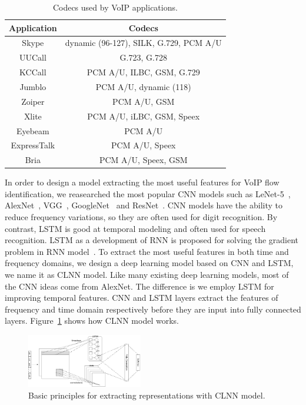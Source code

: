 \documentclass[conference]{IEEEtran}
\begin{document}
\begin{table}[htbp]
  \caption{Codecs used by VoIP applications.}
  \label{tab:codecs}
  \centering
  \begin{tabular}{c c}
    \hline
    \textbf{Application} & \textbf{Codecs}\\
    \hline
    Skype      & dynamic (96-127), SILK, G.729, PCM A/U  \\
    UUCall      & G.723, G.728  \\
    KCCall      & PCM A/U, ILBC, GSM, G.729  \\
    Jumblo      & PCM A/U, dynamic (118)  \\
    Zoiper      & PCM A/U, GSM  \\
    Xlite      &  PCM A/U, iLBC, GSM, Speex \\
    Eyebeam      & PCM A/U  \\
    ExpressTalk      & PCM A/U, Speex  \\
    Bria      & PCM A/U, Speex, GSM  \\
    \hline
  \end{tabular}
\end{table}

In order to design a model extracting the most useful features for VoIP flow identification, we reasearched the most popular CNN models such as LeNet-5~\cite{6}, AlexNet~\cite{8}, VGG~\cite{9}, GoogleNet~\cite{10} and ResNet~\cite{11}. CNN models have the ability to reduce frequency variations, so they are often used for digit recognition. By contrast, LSTM is good at temporal modeling and often used for speech recognition. LSTM as a development of RNN is proposed for solving the gradient problem in RNN model~\cite{lstm}. To extract the most useful features in both time and frequency domains, we design a deep learning model based on CNN and LSTM, we name it as CLNN model. Like many existing deep learning models, most of the CNN ideas come from AlexNet. The difference is we employ LSTM for improving temporal features. CNN and LSTM layers extract the features of frequency and time domain respectively before they are input into fully connected layers. Figure~\ref{fig:cnnlstm} shows how CLNN model works.

\begin{figure}[htp]
\begin{center}
\includegraphics[width=0.45\textwidth]{cnnlstm.eps}
\caption{Basic principles for extracting representations with CLNN model.}\label{fig:cnnlstm}
\end{center}
\end{figure}
\end{document}
